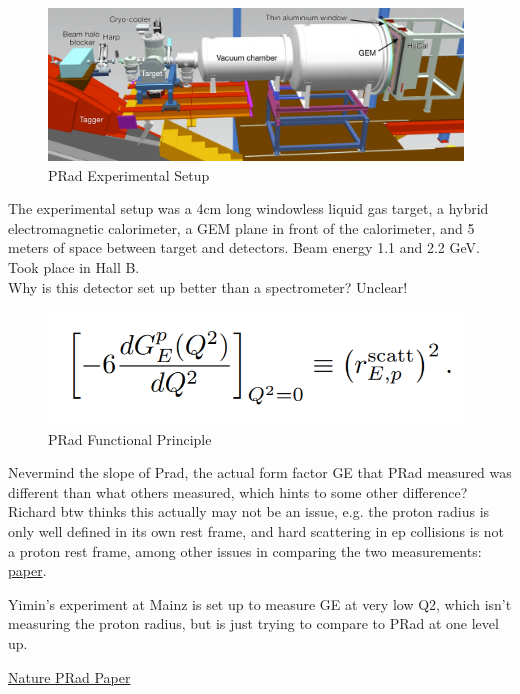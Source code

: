             \begin{figure}[H]
                \centering
                \includegraphics[width=11cm]{NuclearPhysics/modules/emc-src-scaling/pics/prad-setup.PNG}
            \caption{PRad Experimental Setup}
            \end{figure}
        
        The experimental setup was a 4cm long windowless liquid gas target, a hybrid electromagnetic calorimeter, a GEM plane in front of the calorimeter, and 5 meters of space between target and detectors. Beam energy 1.1 and 2.2 GeV. Took place in Hall B. \\
        Why is this detector set up better than a spectrometer? Unclear!
        
            \begin{figure}[H]
                \centering
                \includegraphics[width=11cm]{NuclearPhysics/modules/emc-src-scaling/pics/prad-GE.PNG}
            \caption{PRad Functional Principle}
            \end{figure}
        
        Nevermind the slope of Prad, the actual form factor GE that PRad measured was different than what others measured, which hints to some other difference? Richard btw thinks this actually may not be an issue, e.g. the proton radius is only well defined in its own rest frame, and hard scattering in ep collisions is not a proton rest frame, among other issues in comparing the two measurements: \href{https://arxiv.org/pdf/1806.10475.pdf}{paper}.
        
        Yimin's experiment at Mainz is set up to measure GE at very low Q2, which isn't measuring the proton radius, but is just trying to compare to PRad at one level up. 
        
        \href{https://www-nature-com.libproxy.mit.edu/articles/s41586-019-1721-2?fbclid=IwAR3edCOsl_PqnQiqe2SQDxfcDS2MutChCfLUiEzHh6y5cjIdKXjuhqiC8d0}{Nature PRad Paper}
